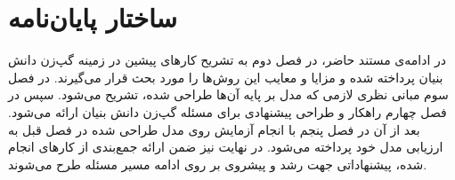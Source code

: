 \section{ساختار پایان‌نامه}

در ادامه‌ی مستند حاضر، در فصل دوم به تشریح کارهای پیشین در زمینه گپ‌زن دانش بنیان پرداخته شده و مزایا و معایب این روش‌ها را مورد بحث قرار می‌گیرند. در فصل سوم مبانی نظری لازمی که مدل بر پایه‌ آن‌ها طراحی شده، تشریح می‌شود. سپس در فصل چهارم راهکار و طراحی پیشنهادی برای مسئله گپ‌زن دانش بنیان ارائه می‌شود. بعد از آن در فصل پنجم با انجام آزمایش‌ روی مدل طراحی شده در فصل قبل به ارزیابی مدل خود پرداخته می‌شود. در نهایت نیز ضمن ارائه جمع‌بندی از کار‌های انجام شده، پیشنهاداتی جهت رشد و پیشروی بر روی ادامه مسیر مسئله طرح می‌شوند.
